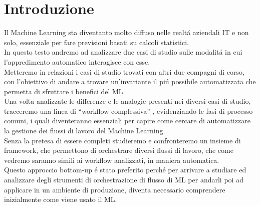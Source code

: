 \documentclass[../tesi.tex]{subfiles}
\begin{document}
\chapter{Introduzione}

Il Machine Learning sta diventanto molto diffuso nelle realtá aziendali IT e non solo, essenziale per fare previsioni basati su calcoli statistici.\\
In questo testo andremo ad analizzare due casi di studio sulle modalitá in cui l’appredimento automatico  interagisce con esse.\\
Metteremo in relazioni i casi di studio trovati con altri due compagni di corso, con l’obiettivo di andare a trovare un'invariante il piú possibile automatizzata che permetta di sfruttare i benefici del ML.\\
Una volta analizzate le differenze e le analogie presenti nei diversi casi di studio, tracceremo una linea di ``workflow complessiva” , evidenziando le fasi di processo comuni, i quali diventeranno essenziali per capire come cercare di automatizzare la gestione dei flussi di lavoro del Machine Learning.\\
Senza la pretesa di essere completi studieremo e confronteremo un insieme di \Gls{framework}, che permettono di orchestrare diversi flussi di lavoro, che come vedremo saranno simili ai workflow analizzati, in maniera automatica.\\
Questo approccio bottom-up é stato preferito perché per arrivare a studiare ed analizzare degli strumenti di orchestrazione di flusso di ML per andarli poi ad applicare in un ambiente di produzione, diventa necessario comprendere inizialmente come viene usato il ML.
\newpage
\end{document}
